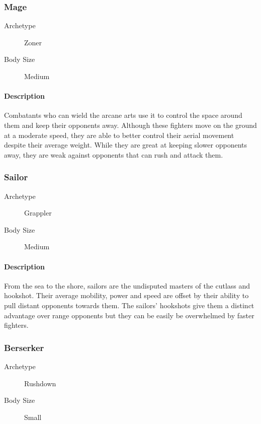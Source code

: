 \subsubsection{Mage}

\begin{description}
    \item[Archetype] Zoner
    \item[Body Size] Medium
\end{description}

\paragraph{Description} Combatants who can wield the arcane arts use it to control the space around them and keep their opponents away. Although these fighters move on the ground at a moderate speed, they are able to better control their aerial movement despite their average weight. While they are great at keeping slower opponents away, they are weak against opponents that can rush and attack them.

\subsubsection{Sailor}

\begin{description}
    \item[Archetype] Grappler
    \item[Body Size] Medium
\end{description}

\paragraph{Description} From the sea to the shore, sailors are the undisputed masters of the cutlass and hookshot. Their average mobility, power and speed are offset by their ability to pull distant opponents towards them. The sailors' hookshots give them a distinct advantage over range opponents but they can be easily be overwhelmed by faster fighters.

\subsubsection{Berserker}

\begin{description}
    \item[Archetype] Rushdown
    \item[Body Size] Small
\end{description}

